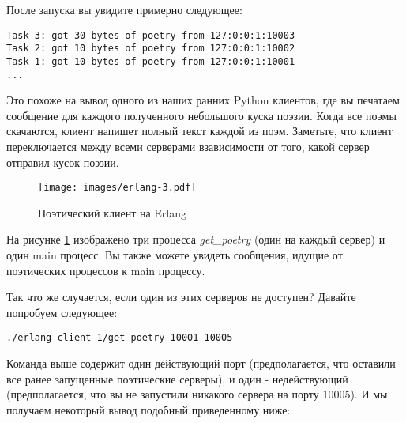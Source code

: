 После запуска вы увидите примерно следующее:

 \begin{verbatim}
Task 3: got 30 bytes of poetry from 127:0:0:1:10003
Task 2: got 10 bytes of poetry from 127:0:0:1:10002
Task 1: got 10 bytes of poetry from 127:0:0:1:10001
...
\end{verbatim} 

Это похоже на вывод одного из наших ранних Python 
клиентов, где вы печатаем сообщение для каждого полученного небольшого 
куска поэзии. Когда все поэмы скачаются, клиент напишет 
полный текст каждой из поэм. Заметьте, что клиент переключается 
между всеми серверами взависимости от того, какой сервер отправил кусок поэзии.

\begin{figure}[h]
\begin{center}
    \texttt{[image: images/erlang-3.pdf]}
    \caption{Поэтический клиент на Erlang\label{fig:erlang-3}}
\end{center}
\end{figure}


На рисунке \ref{fig:erlang-3}  изображено три процесса \textit{get\_poetry} (один 
на каждый сервер) и один main процесс. Вы также можете увидеть 
сообщения, идущие от поэтических процессов к main процессу. 


Так что же случается, если один из этих серверов не доступен? 
Давайте попробуем следующее:
 \begin{verbatim}
./erlang-client-1/get-poetry 10001 10005
\end{verbatim} 


Команда выше содержит один действующий порт (предполагается, 
что оставили все ранее запущенные поэтические серверы), и 
один - недействующий (предполагается, что вы не запустили 
никакого сервера на порту 10005). И мы получаем некоторый вывод 
подобный приведенному ниже:

